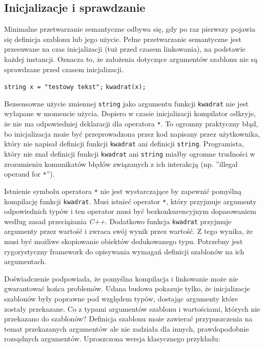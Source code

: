 \documentclass[11pt, a4paper]{article}
\begin{document}
\lstset{language=C++}

\subsection{Inicjalizacje i sprawdzanie}

Minimalne przetwarzanie semantyczne odbywa się, gdy po raz pierwszy pojawia się definicja szablonu lub jego użycie. Pełne przetwarzanie semantyczne jest przesuwane na czas inicjalizacji (tuż przed czasem linkowania), na podstawie każdej instancji. Oznacza to, że założenia dotyczące argumentów szablonu nie są sprawdzane przed czasem inicjalizacji.\newline

\noindent \verb#string x = "testowy tekst";# \newline
\verb#kwadrat(x);# \newline

Bezsensowne użycie zmiennej \verb#string# jako argumentu funkcji \verb#kwadrat# nie jest wyłapane w momencie użycia. Dopiero w czasie inicjalizacji kompilator odkryje, że nie ma odpowiedniej deklaracji dla operatora \verb#*#. To ogromny praktyczny błąd, bo inicjalizacja może być przeprowadzona przez kod napisany przez użytkownika, który nie napisał definicji funkcji \verb#kwadrat# ani definicji \verb#string#. Programista, który nie znał definicji funkcji \verb#kwadrat# ani \verb#string# miałby ogromne trudności w zrozumieniu komunikatów błędów związanych z ich interakcją (np. ”illegal operand for \verb#*#”).

Istnienie symbolu operatora \verb#*# nie jest wystarczające by zapewnić pomyślną kompilację funkcji \verb#kwadrat#. Musi istnieć operator \verb#*#, który przyjmuje argumenty odpowiednich typów i ten operator musi być bezkonkurencyjnym dopasowaniem według zasad przeciążania \emph{C++}. Dodatkowo funkcja \verb#kwadrat# przyjmuje argumenty przez wartość i zwraca swój wynik przez wartość. Z tego wynika, że musi być możliwe skopiowanie obiektów dedukowanego typu. Potrzebny jest rygorystyczny framework do opisywania wymagań definicji szablonów na ich argumentach.

Doświadczenie podpowiada, że pomyślna kompilacja i linkowanie może nie gwarantować końca problemów. Udana budowa pokazuje tylko, że inicjalizacje szablonów były poprawne pod względem typów, dostając argumenty które zostały przekazane. Co z typami argumentów szablonu i wartościami, których nie przekazano do szablonów? Definicja szablonu może zawierać przypuszczenia na temat przekazanych argumentów ale nie zadziała dla innych, prawdopodobnie rozsądnych argumentów. Uproszczona wersja klasycznego przykładu:
\end{document}
